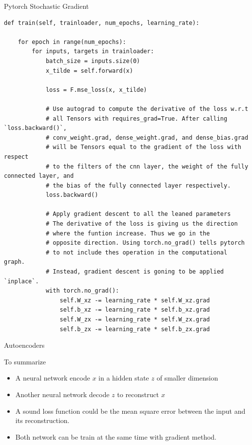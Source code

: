 \documentclass{beamer}
\begin{document}
\begin{frame}[fragile]{Pytorch Stochastic Gradient}
\begin{verbatim}
def train(self, trainloader, num_epochs, learning_rate):

    for epoch in range(num_epochs):
        for inputs, targets in trainloader:
            batch_size = inputs.size(0)
            x_tilde = self.forward(x)

            loss = F.mse_loss(x, x_tilde)

            # Use autograd to compute the derivative of the loss w.r.t 
            # all Tensors with requires_grad=True. After calling `loss.backward()`, 
            # conv_weight.grad, dense_weight.grad, and dense_bias.grad 
            # will be Tensors equal to the gradient of the loss with respect 
            # to the filters of the cnn layer, the weight of the fully connected layer, and 
            # the bias of the fully connected layer respectively.
            loss.backward()
            
            # Apply gradient descent to all the leaned parameters
            # The derivative of the loss is giving us the direction
            # where the funtion increase. Thus we go in the 
            # opposite direction. Using torch.no_grad() tells pytorch
            # to not include thes operation in the computational graph.
            # Instead, gradient descent is goning to be applied `inplace`.
            with torch.no_grad():
                self.W_xz -= learning_rate * self.W_xz.grad
                self.b_xz -= learning_rate * self.b_xz.grad
                self.W_zx -= learning_rate * self.W_zx.grad
                self.b_zx -= learning_rate * self.b_zx.grad
\end{verbatim}
\end{frame}

\begin{frame}{Autoencoders}

To summarize
\begin{itemize}
	\item A neural network encode $x$ in a hidden state $z$ of smaller dimension
	\item Another neural network decode $z$ to reconstruct $x$
	\item A sound loss function could be the mean square error between the input and its reconstruction.
	\item Both network can be train at the same time with gradient method.
\end{itemize}
\end{frame}
\end{document}
